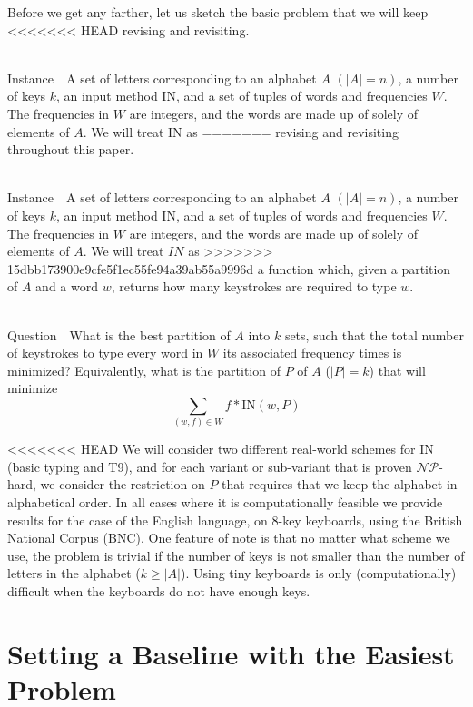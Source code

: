 \documentclass[runningheads]{llncs}
\newcommand{\NP}{\ensuremath{\mathcal{NP}}}
\newcommand{\Instance}{{\sc Instance~}}
\newcommand{\Question}{~\\
{\sc Question~}}
\begin{document}
Before we get any farther, let us sketch the basic problem that we will keep
<<<<<<< HEAD
revising and revisiting.  \begin{prob}[{\sc
MinimumKeystrokes}]~\\ \Instance\ A set of letters corresponding to an alphabet
$A$ $(|A| = n)$, a number of keys $k$, an input method $\mathrm{IN}$, and a set
of tuples of words and frequencies $W$.  The frequencies in $W$ are integers,
and the words are made up of solely of elements of $A$.  We will treat $\mathrm{IN}$ as
=======
revising and revisiting throughout this paper.  \begin{prob}[{\sc
MinimumKeystrokes}]~\\ \Instance\ A set of letters corresponding to an alphabet
$A$ $(|A| = n)$, a number of keys $k$, an input method $\mathrm{IN}$, and a set
of tuples of words and frequencies $W$.  The frequencies in $W$ are integers,
and the words are made up of solely of elements of $A$.  We will treat $IN$ as
>>>>>>> 15dbb173900e9cfe5f1ec55fe94a39ab55a9996d
a function which, given a partition of $A$ and a word $w$, returns how many
keystrokes are required to type $w$.

\Question\ What is the best partition of $A$ into $k$ sets, such that the
total number of keystrokes to type every word in $W$ its associated frequency
times is minimized?  Equivalently, what is the partition of $P$ of $A$ ($|P| = k$) that
will minimize
$$\sum_{(w,f)\in W} f*\mathrm{IN}(w,P)$$
\label{probtemplate}
\end{prob}


<<<<<<< HEAD
We will consider two different real-world schemes for $\mathrm{IN}$ (basic
typing and T9), and for each variant or sub-variant that is proven \NP-hard, we
consider the restriction on $P$ that requires that we keep the alphabet in
alphabetical order.  In all cases where it is computationally feasible we
provide results for the case of the English language, on 8-key keyboards, using
the British National Corpus\cite{bnc} (BNC).  One feature of note is that no
matter what scheme we use, the problem is trivial if the number of keys is not
smaller than the number of letters in the alphabet ($k \ge |A|$).  Using tiny
keyboards is only (computationally) difficult when the keyboards do not have
enough keys.

\section{Setting a Baseline with the Easiest Problem}


\end{prob}
\end{document}

